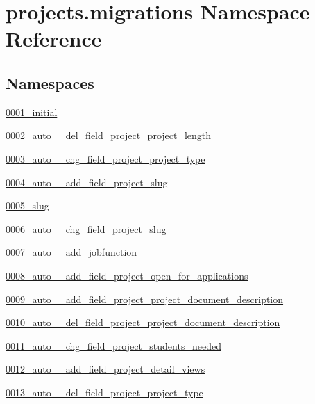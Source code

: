 \hypertarget{namespaceprojects_1_1migrations}{\section{projects.\-migrations Namespace Reference}
\label{namespaceprojects_1_1migrations}
}
\subsection*{Namespaces}
\begin{DoxyCompactItemize}
\item 
\hyperlink{namespaceprojects_1_1migrations_1_10001__initial}{0001\-\_\-initial}
\item 
\hyperlink{namespaceprojects_1_1migrations_1_10002__auto____del__field__project__project__length}{0002\-\_\-auto\-\_\-\-\_\-del\-\_\-field\-\_\-project\-\_\-project\-\_\-length}
\item 
\hyperlink{namespaceprojects_1_1migrations_1_10003__auto____chg__field__project__project__type}{0003\-\_\-auto\-\_\-\-\_\-chg\-\_\-field\-\_\-project\-\_\-project\-\_\-type}
\item 
\hyperlink{namespaceprojects_1_1migrations_1_10004__auto____add__field__project__slug}{0004\-\_\-auto\-\_\-\-\_\-add\-\_\-field\-\_\-project\-\_\-slug}
\item 
\hyperlink{namespaceprojects_1_1migrations_1_10005__slug}{0005\-\_\-slug}
\item 
\hyperlink{namespaceprojects_1_1migrations_1_10006__auto____chg__field__project__slug}{0006\-\_\-auto\-\_\-\-\_\-chg\-\_\-field\-\_\-project\-\_\-slug}
\item 
\hyperlink{namespaceprojects_1_1migrations_1_10007__auto____add__jobfunction}{0007\-\_\-auto\-\_\-\-\_\-add\-\_\-jobfunction}
\item 
\hyperlink{namespaceprojects_1_1migrations_1_10008__auto____add__field__project__open__for__applications}{0008\-\_\-auto\-\_\-\-\_\-add\-\_\-field\-\_\-project\-\_\-open\-\_\-for\-\_\-applications}
\item 
\hyperlink{namespaceprojects_1_1migrations_1_10009__auto____add__field__project__project__document__description}{0009\-\_\-auto\-\_\-\-\_\-add\-\_\-field\-\_\-project\-\_\-project\-\_\-document\-\_\-description}
\item 
\hyperlink{namespaceprojects_1_1migrations_1_10010__auto____del__field__project__project__document__description}{0010\-\_\-auto\-\_\-\-\_\-del\-\_\-field\-\_\-project\-\_\-project\-\_\-document\-\_\-description}
\item 
\hyperlink{namespaceprojects_1_1migrations_1_10011__auto____chg__field__project__students__needed}{0011\-\_\-auto\-\_\-\-\_\-chg\-\_\-field\-\_\-project\-\_\-students\-\_\-needed}
\item 
\hyperlink{namespaceprojects_1_1migrations_1_10012__auto____add__field__project__detail__views}{0012\-\_\-auto\-\_\-\-\_\-add\-\_\-field\-\_\-project\-\_\-detail\-\_\-views}
\item 
\hyperlink{namespaceprojects_1_1migrations_1_10013__auto____del__field__project__project__type}{0013\-\_\-auto\-\_\-\-\_\-del\-\_\-field\-\_\-project\-\_\-project\-\_\-type}
\end{DoxyCompactItemize}
